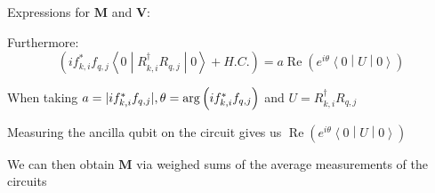 \documentclass[professionalfonts]{beamer}
\newcommand{\sandwich}[3]{\left< #1 \middle\vert #2 \middle\vert #3 \right>}
\newcommand{\paren}[1]{\left( #1 \right)}
\DeclarePairedDelimiter\abs{\lvert}{\rvert}
\newcommand{\SubItem}[1]{
    {\setlength\itemindent{15pt} \item[*] #1}
}
\begin{document}
\begin{frame}{Expressions for $\bm M$ and $\bm V$:}
	\begin{itemize}
		\item Furthermore:
			\[
				\paren{if_{k, i}^*f_{q, j}\sandwich 0 {R_{k, i}^\dagger R_{q, j}} 0 + H.C.} 
				= a\operatorname{Re}\paren{e^{i\theta}\sandwich 0 U 0}
			\]
			\SubItem{When taking $a = \abs{if_{k, i}^*f_{q, j}}, \theta = \arg \paren{if_{k, i}^*f_{q, j}}$ and $U = {R_{k, i}^\dagger R_{q, j}}$}
		\item Measuring the ancilla qubit on the circuit gives us $\operatorname{Re}\paren{e^{i\theta}\sandwich 0 U 0}$
			\SubItem{We can then obtain $\bm M$ via weighed sums of the average measurements of the circuits}
	\end{itemize}
\end{frame}

\end{document}
